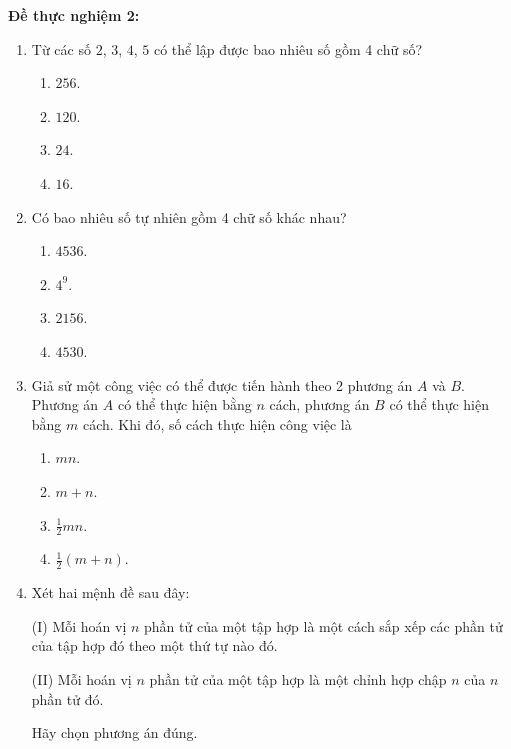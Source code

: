 \noindent\textbf{Đề thực nghiệm 2:}
\begin{enumerate}[label=\textbf{Câu \arabic*.},align=left,left=0cm..0cm,itemindent=*]
	\item Từ các số $2$, $3$, $4$, $5$ có thể lập được bao nhiêu số gồm 4 chữ số?
	\begin{multicols}{4}\begin{enumerate}[label=\textbf{\Alph*.},align=left,left=1cm..0cm,itemindent=*]
		\item $256$. \item $120$. \item $24$. \item $16$.
	\end{enumerate}\end{multicols}
	\item Có bao nhiêu số tự nhiên gồm 4 chữ số khác nhau?
	\begin{multicols}{4}\begin{enumerate}[label=\textbf{\Alph*.},align=left,left=1cm..0cm,itemindent=*]
		\item $4536$. \item $4^9$. \item $2156$. \item $4530$.
	\end{enumerate}\end{multicols}
	\item Giả sử một công việc có thể được tiến hành theo 2 phương án $A$ và $B$. Phương án $A$ có thể thực hiện bằng $n$ cách, phương án $B$ có thể thực hiện bằng $m$ cách. Khi đó, số cách thực hiện công việc là
	\begin{multicols}{4}\begin{enumerate}[label=\textbf{\Alph*.},align=left,left=1cm..0cm,itemindent=*]
		\item $mn$. \item $m+n$. \item $\frac 12mn$. \item $\frac 12(m+n)$.
	\end{enumerate}\end{multicols}
	\item Xét hai mệnh đề sau đây:\par
	(I) Mỗi hoán vị $n$ phần tử của một tập hợp là một cách sắp xếp các phần tử của tập hợp đó theo một thứ tự nào đó.\par
	(II) Mỗi hoán vị $n$ phần tử của một tập hợp là một chỉnh hợp chập $n$ của $n$ phần tử đó.\par
	Hãy chọn phương án đúng.

\end{enumerate}
